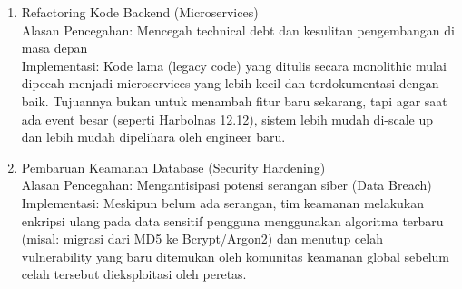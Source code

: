 \begin{enumerate}[leftmargin=*, label=\textbf{\arabic*.}]
            \begin{enumerate}[leftmargin=0.5cm, label=\textbf{\arabic*.}]
                  \item Refactoring Kode Backend (Microservices)\\
                        Alasan Pencegahan: Mencegah technical debt dan kesulitan pengembangan di masa depan\\
                        Implementasi: Kode lama (legacy code) yang ditulis secara monolithic mulai dipecah menjadi microservices yang lebih kecil dan terdokumentasi dengan baik. Tujuannya bukan untuk menambah fitur baru sekarang, tapi agar saat ada event besar (seperti Harbolnas 12.12), sistem lebih mudah di-scale up dan lebih mudah dipelihara oleh engineer baru.\\
                  \item Pembaruan Keamanan Database (Security Hardening)\\
                        Alasan Pencegahan: Mengantisipasi potensi serangan siber (Data Breach)\\
                        Implementasi: Meskipun belum ada serangan, tim keamanan melakukan enkripsi ulang pada data sensitif pengguna menggunakan algoritma terbaru (misal: migrasi dari MD5 ke Bcrypt/Argon2) dan menutup celah vulnerability yang baru ditemukan oleh komunitas keamanan global sebelum celah tersebut dieksploitasi oleh peretas.
            \end{enumerate}

\end{enumerate}